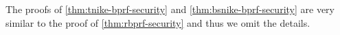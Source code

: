 	The proofs of \cref{thm:tnike-bprf-security} and \cref{thm:bsnike-bprf-security} are very similar to the proof of \cref{thm:rbprf-security} and thus we omit the details. %
%	
